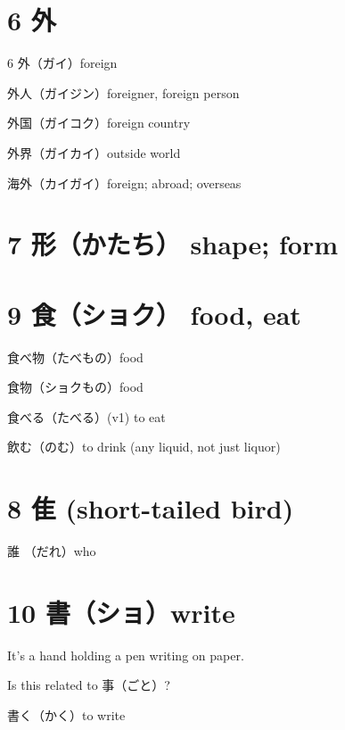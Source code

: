 \section{6 外}

6 外（ガイ）foreign

外人（ガイジン）foreigner, foreign person

外国（ガイコク）foreign country

外界（ガイカイ）outside world

海外（カイガイ）foreign; abroad; overseas

\section{7 形（かたち） shape; form}

\section{9 食（ショク） food, eat}

食べ物（たべもの）food

食物（ショクもの）food

食べる（たべる）(v1) to eat

飲む（のむ）to drink (any liquid, not just liquor)

\section{8 隹 (short-tailed bird)}

誰 （だれ）who

\section{10 書（ショ）write}

It's a hand holding a pen writing on paper.

Is this related to 事（ごと）?

書く（かく）to write
